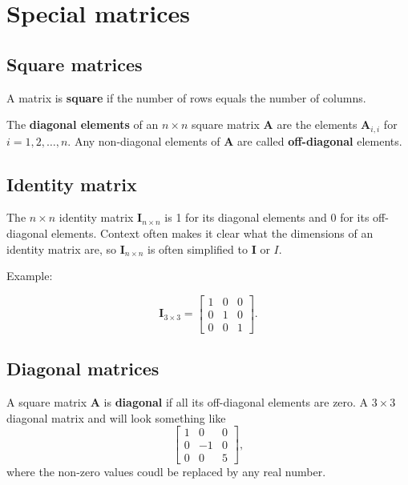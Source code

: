 \documentclass[
]{book}
\theoremstyle{definition}
\theoremstyle{definition}
\theoremstyle{definition}
\theoremstyle{definition}
\theoremstyle{remark}
\begin{document}
\hypertarget{special-matrices}{%
\section{Special matrices}\label{special-matrices}}

\hypertarget{square-matrices}{%
\subsection{Square matrices}\label{square-matrices}}

A matrix is \textbf{square} if the number of rows equals the number of columns.

The \textbf{diagonal elements} of an \(n\times n\) square matrix \(\mathbf{A}\) are the elements \(\mathbf{A}_{i,i}\) for \(i = 1, 2, \ldots, n\). Any non-diagonal elements of \(\mathbf{A}\) are called \textbf{off-diagonal} elements.

\hypertarget{identity-matrix}{%
\subsection{Identity matrix}\label{identity-matrix}}

The \(n\times n\) identity matrix \(\mathbf{I}_{n\times n}\) is 1 for its diagonal elements and 0 for its off-diagonal elements. Context often makes it clear what the dimensions of an identity matrix are, so \(\mathbf{I}_{n\times n}\) is often simplified to \(\mathbf{I}\) or \(I\).

Example:

\[
\mathbf{I}_{3\times 3} = \begin{bmatrix}
1 & 0 & 0 \\
0 & 1 & 0 \\
0 & 0 & 1
\end{bmatrix}.
\]

\hypertarget{diagonal-matrices}{%
\subsection{Diagonal matrices}\label{diagonal-matrices}}

A square matrix \(\mathbf{A}\) is \textbf{diagonal} if all its off-diagonal elements are zero. A \(3\times 3\) diagonal matrix and will look something like
\[
\begin{bmatrix}
1 & 0 & 0\\
0 & -1 & 0\\
0 & 0 & 5
\end{bmatrix},
\]
where the non-zero values coudl be replaced by any real number.
\end{document}
